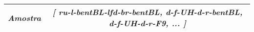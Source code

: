 \begin{table}[]
{\begin{tabular}{rcccccc}
            \multicolumn{1}{r|}{\textit{Amostra}}         & \multicolumn{6}{c}{\textit{{[} ru-l-bentBL-lfd-br-bentBL, d-f-UH-d-r-bentBL, d-f-UH-d-r-F9, ... {]}}}                                                                                                                                                             \\ \hline
        \end{tabular}%
    }
    \nomefonte{}
\end{table}